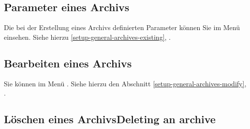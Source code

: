 \subsection{Parameter eines Archivs\label{datamanagement-archive-parameters}}

Die bei der Erstellung eines Archivs definierten Parameter können Sie im Menü  einsehen. Siehe hierzu \vref{setup-general-archives-existing}, .

\subsection{Bearbeiten eines Archivs\label{datamanagement-archive-modify}}

Sie können  im Menü . Siehe hierzu den Abschnitt \vref{setup-general-archives-modify}, .

\subsection{Löschen eines ArchivsDeleting an archive\label{datamanagement-archive-remove}}

